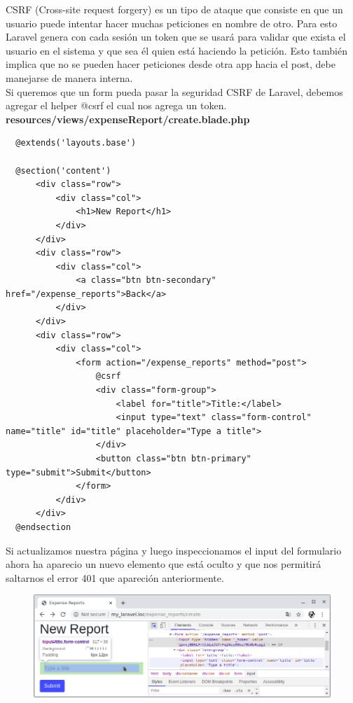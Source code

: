 \documentclass{article}
\begin{document}
CSRF (Cross-site request forgery) es un tipo de ataque que consiste en que un
usuario puede intentar hacer muchas peticiones en nombre de otro. Para esto
Laravel genera con cada sesión un token que se usará para validar que exista el
usuario en el sistema y que sea él quien está haciendo la petición. Esto
también implica que no se pueden hacer peticiones desde otra app hacia el post,
debe manejarse de manera interna.\\

Si queremos que un form pueda pasar la seguridad CSRF de Laravel, debemos
agregar el helper @csrf el cual nos agrega un token.\\

\textbf{resources/views/expenseReport/create.blade.php}
\begin{verbatim}
  @extends('layouts.base')

  @section('content')
      <div class="row">
          <div class="col">
              <h1>New Report</h1>
          </div>
      </div>
      <div class="row">
          <div class="col">
              <a class="btn btn-secondary" href="/expense_reports">Back</a>
          </div>
      </div>
      <div class="row">
          <div class="col">
              <form action="/expense_reports" method="post">
                  @csrf
                  <div class="form-group">
                      <label for="title">Title:</label>
                      <input type="text" class="form-control" name="title" id="title" placeholder="Type a title">
                  </div>
                  <button class="btn btn-primary" type="submit">Submit</button>
              </form>
          </div>
      </div>
  @endsection
\end{verbatim}

Si actualizamos nuestra página y luego inspeccionamos el input del formulario
ahora ha aparecio un nuevo elemento que está oculto y que nos permitirá
saltarnos el error 401 que apareción anteriormente.

\begin{figure}[h!]
  \centering
  \includegraphics[scale=0.5]{./Pictures/061_token_hidden_scrf.png}
\end{figure}
\end{document}
